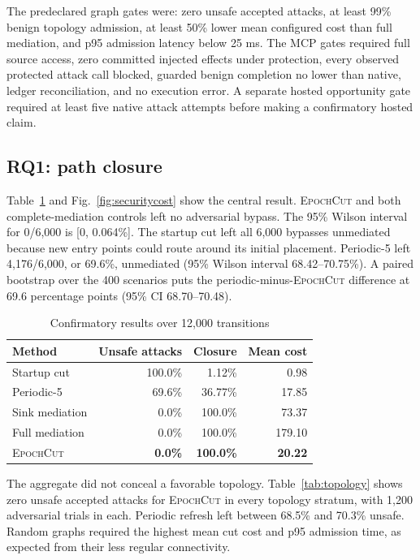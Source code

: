 \documentclass[10pt,journal,compsoc]{IEEEtran}
\newcommand{\system}{\textsc{EpochCut}}
\begin{document}
The predeclared graph gates were: zero unsafe accepted attacks, at least 99\%
benign topology admission, at least 50\% lower mean configured cost than full
mediation, and p95 admission latency below 25 ms.  The MCP gates required full
source access, zero committed injected effects under protection, every observed
protected attack call blocked, guarded benign completion no lower than native,
ledger reconciliation, and no execution error.  A separate hosted opportunity
gate required at least five native attack attempts before making a confirmatory
hosted claim.

\subsection{RQ1: path closure}

Table~\ref{tab:results} and Fig.~\ref{fig:securitycost} show the central result.
\system{} and both complete-mediation controls left no adversarial bypass.
The 95\% Wilson interval for 0/6,000 is [0, 0.064\%].  The startup cut left all
6,000 bypasses unmediated because new entry points could route around its
initial placement.  Periodic-5 left 4,176/6,000, or 69.6\%, unmediated (95\%
Wilson interval 68.42--70.75\%).  A paired bootstrap over the 400 scenarios
puts the periodic-minus-\system{} difference at 69.6 percentage points (95\%
CI 68.70--70.48).

\begin{table}[t]
\caption{Confirmatory results over 12,000 transitions}
\label{tab:results}
\centering
\footnotesize
\begin{tabular}{lrrr}
\toprule
Method & Unsafe attacks & Closure & Mean cost \\
\midrule
Startup cut & 100.0\% & 1.12\% & 0.98 \\
Periodic-5 & 69.6\% & 36.77\% & 17.85 \\
Sink mediation & 0.0\% & 100.0\% & 73.37 \\
Full mediation & 0.0\% & 100.0\% & 179.10 \\
\system & \textbf{0.0\%} & \textbf{100.0\%} & \textbf{20.22} \\
\bottomrule
\end{tabular}
\end{table}

The aggregate did not conceal a favorable topology.  Table~\ref{tab:topology}
shows zero unsafe accepted attacks for \system{} in every topology stratum,
with 1,200 adversarial trials in each.  Periodic refresh left between 68.5\%
and 70.3\% unsafe.  Random graphs required the highest mean cut cost and p95
admission time, as expected from their less regular connectivity.
\end{document}
